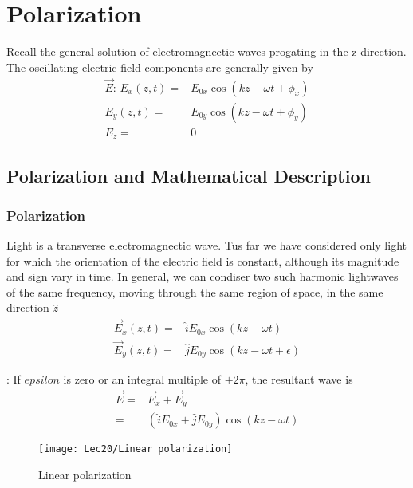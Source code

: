 \newpage
\section{Polarization}
Recall the general solution of electromagnectic waves progating in the z-direction. The oscillating electric field components are generally given by
\begin{align*}
    \vec{E}: \, E_x(z,t)=&E_{0x}\cos(kz-\omega t+\phi_x)\\
    E_y(z,t)=&E_{0y}\cos(kz-\omega t+\phi_y)\\
    E_z=&0
\end{align*}

\subsection{Polarization and Mathematical Description}
\subsubsection{Polarization}
Light is a transverse electromagnectic wave. Tus far we have considered only light for which the orientation of the electric field is constant, although its magnitude and sign vary in time. In general, we can condiser two such harmonic lightwaves of the same frequency, moving through the same region of space, in the same direction $\hat{z}$
\begin{align*}
    \vec{E}_x(z,t)=&\hat{i}E_{0x}\cos(kz-\omega t)\\
    \vec{E}_y(z,t)=&\hat{j}E_{0y}\cos(kz-\omega t+ \epsilon)
\end{align*}

: If $epsilon$ is zero or an integral multiple of $\pm 2\pi$, the resultant wave is
\begin{align*}
    \vec{E}=&\vec{E}_x+\vec{E}_y\\
    =&\left(\hat{i}E_{0x}+\hat{j}E_{0y}\right)\cos(kz-\omega t)
\end{align*}

\begin{figure}[H]
    \centering
    \texttt{[image: Lec20/Linear polarization]}
    \caption{Linear polarization}
\end{figure}

